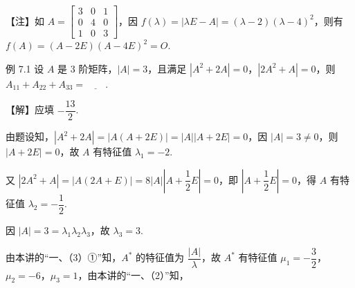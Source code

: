 \begin{fnote}
【注】如 $A=\begin{bmatrix}3&0&1\\0&4&0\\1&0&3\end{bmatrix}$，因 $f(\lambda)=|\lambda E-A|=(\lambda-2)(\lambda-4)^{2}$，则有 $f(A)=(A-2E)(A-4E)^{2}=O$.
\end{fnote}


\begin{fcard}{例 7.1}
设 $A$ 是 3 阶矩阵，$|A|=3$，且满足 $|A^{2}+2A|=0$，$|2A^{2}+A|=0$，则 $A_{11}+A_{22}+A_{33}=\underline{\hspace{2em}}$.

【解】应填 $-\dfrac{13}{2}$.

由题设知，$|A^{2}+2A|=|A(A+2E)|=|A||A+2E|=0$，因 $|A|=3\ne0$，则 $|A+2E|=0$，故 $A$ 有特征值 $\lambda_1=-2$.

又 $|2A^{2}+A|=|A(2A+E)|=8|A|\left|A+\dfrac{1}{2}E\right|=0$，即 $\left|A+\dfrac{1}{2}E\right|=0$，得 $A$ 有特征值 $\lambda_2=-\dfrac{1}{2}$.

因 $|A|=3=\lambda_1\lambda_2\lambda_3$，故 $\lambda_3=3$.

由本讲的“一、（3）①”知，$A^{*}$ 的特征值为 $\dfrac{|A|}{\lambda}$，故 $A^{*}$ 有特征值 $\mu_1=-\dfrac{3}{2}$，$\mu_2=-6$，$\mu_3=1$，由本讲的“一、（2）”知，
\end{fcard}



